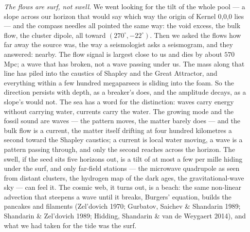 \documentclass[
  11pt,
]{article}
\begin{document}
\emph{The flows are surf, not swell.} We went looking for the tilt of
the whole pool --- a slope across our horizon that would say which way
the origin of Kernel 0,0,0 lies --- and the compass needles all pointed
the same way: the void excess, the bulk flow, the cluster dipole, all
toward \((270^\circ, -22^\circ)\). Then we asked the flows how far away
the source was, the way a seismologist asks a seismogram, and they
answered: nearby. The flow signal is largest close to us and dies by
about \(570\) Mpc; a wave that has broken, not a wave passing under us.
The mass along that line has piled into the caustics of Shapley and the
Great Attractor, and everything within a few hundred megaparsecs is
sliding into the foam. So the direction persists with depth, as a
breaker's does, and the amplitude decays, as a slope's would not. The
sea has a word for the distinction: waves carry energy without carrying
water, currents carry the water. The growing mode and the fossil sound
are waves --- the pattern moves, the matter barely does --- and the bulk
flow is a current, the matter itself drifting at four hundred kilometres
a second toward the Shapley caustics; a current is local water moving, a
wave is a pattern passing through, and only the second reaches across
the horizon. The swell, if the seed sits five horizons out, is a tilt of
at most a few per mille hiding under the surf, and only far-field
stations --- the microwave quadrupole as seen from distant clusters, the
hydrogen map of the dark ages, the gravitational-wave sky --- can feel
it. The cosmic web, it turns out, is a beach: the same non-linear
advection that steepens a wave until it breaks, Burgers' equation,
builds the pancakes and filaments (Zel'dovich 1970; Gurbatov, Saichev \&
Shandarin 1989; Shandarin \& Zel'dovich 1989; Hidding, Shandarin \& van
de Weygaert 2014), and what we had taken for the tide was the surf.
\end{document}
